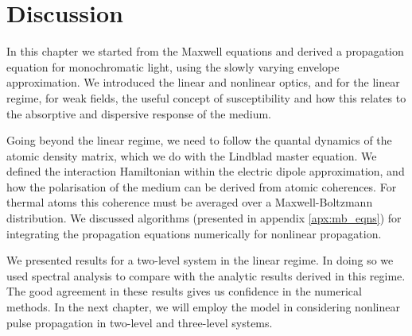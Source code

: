 \section{Discussion}
  \label{sec:propagation_discussion}

    In this chapter we started from the Maxwell equations and derived a
    propagation equation for monochromatic light, using the slowly varying
    envelope approximation. We introduced the linear and nonlinear optics, and
    for the linear regime, for weak fields, the useful concept of susceptibility
    and how this relates to the absorptive and dispersive response of the
    medium.

    Going beyond the linear regime, we need to follow the quantal dynamics of
    the atomic density matrix, which we do with the Lindblad master equation. We
    defined the interaction Hamiltonian within the electric dipole
    approximation, and how the polarisation of the medium can be derived from
    atomic coherences. For thermal atoms this coherence must be averaged over a
    Maxwell-Boltzmann distribution. We discussed algorithms (presented in
    appendix \ref{apx:mb_eqns}) for integrating the propagation equations
    numerically for nonlinear propagation.

    We presented results for a two-level system in the linear regime. In doing
    so we used spectral analysis to compare with the analytic results derived in
    this regime. The good agreement in these results gives us confidence in the
    numerical methods. In the next chapter, we will employ the model in
    considering nonlinear pulse propagation in two-level and three-level
    systems.
